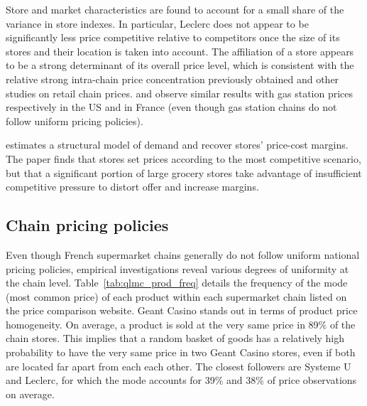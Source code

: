 \documentclass[english]{article}
\begin{document}
Store and market characteristics are found to account for a small share of the variance in store indexes. In particular, Leclerc does not appear to be significantly less price competitive relative to competitors once the size of its stores and their location is taken into account. The affiliation of a store appears to be a strong determinant of its overall price level, which is consistent with the relative strong intra-chain price concentration previously obtained and other studies on retail chain prices. \cite{HOS08} and \cite{CHA16} observe similar results with gas station prices respectively in the US and in France (even though gas station chains do not follow uniform pricing policies).

\cite{TUR16} estimates a structural model of demand and recover stores' price-cost margins. The paper finds that stores set prices according to the most competitive scenario, but that a significant portion of large grocery stores take advantage of insufficient competitive pressure to distort offer and increase margins.

\subsection{Chain pricing policies}

Even though French supermarket chains generally do not follow uniform national pricing policies, empirical investigations reveal various degrees of uniformity at the chain level. Table~\ref{tab:qlmc_prod_freq} details the frequency of the mode (most common price) of each product within each supermarket chain listed on the price comparison website. Geant Casino stands out in terms of product price homogeneity. On average, a product is sold at the very same price in 89\% of the chain stores. This implies that a random basket of goods has a relatively high probability to have the very same price in two Geant Casino stores, even if both are located far apart from each each other. The closest followers are Systeme U and Leclerc, for which the mode accounts for 39\% and 38\% of price observations on average.
\end{document}
